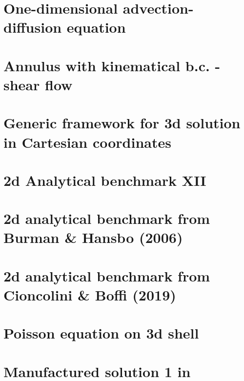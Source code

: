\section{One-dimensional advection-diffusion equation \label{ss:advdiff} }


\section{Annulus with kinematical b.c. - shear flow}\label{ss:sfan}


\section{Generic framework for 3d solution in Cartesian coordinates}\label{ss:mms3Dgen}


\section{2d Analytical benchmark XII}\label{ss:sofo87_2D}


\section{2d analytical benchmark from Burman \& Hansbo (2006)}\label{ss:mms_buha06}


\section{2d analytical benchmark from Cioncolini \& Boffi (2019) \label{ss:mms_cibo19}}


\section{Poisson equation on 3d shell}
 

\section{Manufactured solution 1 in \textcite{jolm17}  \label{ss:mms_jolm17a}}

